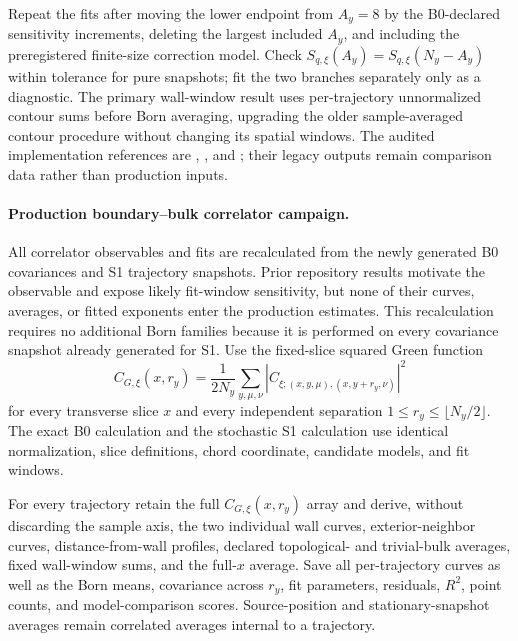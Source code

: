 \documentclass[aps,prx,onecolumn,nofootinbib,superscriptaddress,longbibliography]{revtex4-2}
\begin{document}
Repeat the fits after moving the lower endpoint from $A_y=8$ by the B0-declared
sensitivity increments, deleting the largest included $A_y$, and including the
preregistered finite-size correction model.  Check
$S_{q,\xi}(A_y)=S_{q,\xi}(N_y-A_y)$ within tolerance for pure snapshots; fit the two
branches separately only as a diagnostic.  The primary wall-window result uses
per-trajectory unnormalized contour sums before Born averaging, upgrading the older
sample-averaged contour procedure without changing its spatial windows.
The audited implementation references are
,
, and
; their
legacy outputs remain comparison data rather than production inputs.

\paragraph{Production boundary--bulk correlator campaign.}
All correlator observables and fits are recalculated from the newly generated B0
covariances and S1 trajectory snapshots.  Prior repository results motivate the observable
and expose likely fit-window sensitivity, but none of their curves, averages, or fitted
exponents enter the production estimates.  This recalculation requires no additional Born
families because it is performed on every covariance snapshot already generated for S1.
Use the fixed-slice squared Green function
\begin{equation}
 C_{G,\xi}(x,r_y)=\frac{1}{2N_y}\sum_{y,\mu,\nu}
 \left|C_{\xi;(x,y,\mu),(x,y+r_y,\nu)}\right|^2
 \label{eq:fixed-x-squared-correlator}
\end{equation}
for every transverse slice $x$ and every independent separation
$1\leq r_y\leq\lfloor N_y/2\rfloor$.  The exact B0 calculation and the stochastic S1
calculation use identical normalization, slice definitions, chord coordinate, candidate
models, and fit windows.

For every trajectory retain the full $C_{G,\xi}(x,r_y)$ array and derive, without
discarding the sample axis, the two individual wall curves, exterior-neighbor curves,
distance-from-wall profiles, declared topological- and trivial-bulk averages, fixed
wall-window sums, and the full-$x$ average.  Save all per-trajectory curves as well as the
Born means, covariance across $r_y$, fit parameters, residuals, $R^2$, point counts, and
model-comparison scores.  Source-position and stationary-snapshot averages remain
correlated averages internal to a trajectory.
\end{document}
